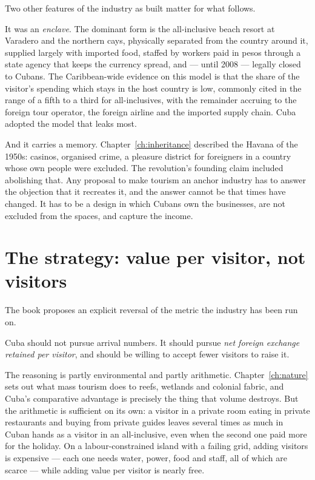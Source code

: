 Two other features of the industry as built matter for what follows.

It was an \emph{enclave}. The dominant form is the all-inclusive beach resort at
Varadero and the northern cays, physically separated from the country around it,
supplied largely with imported food, staffed by workers paid in pesos through a
state agency that keeps the currency spread, and --- until 2008 --- legally
closed to Cubans. The Caribbean-wide evidence on this model is that the share of
the visitor's spending which stays in the host country is low, commonly cited in
the range of a fifth to a third for all-inclusives, with the remainder accruing
to the foreign tour operator, the foreign airline and the imported supply
chain.\unv{} Cuba adopted the model that leaks most.

And it carries a memory. Chapter~\ref{ch:inheritance} described the Havana of
the 1950s: casinos, organised crime, a pleasure district for foreigners in a
country whose own people were excluded. The revolution's founding claim included
abolishing that. Any proposal to make tourism an anchor industry has to answer
the objection that it recreates it, and the answer cannot be that times have
changed. It has to be a design in which Cubans own the businesses, are not
excluded from the spaces, and capture the income.

\section{The strategy: value per visitor, not visitors}

The book proposes an explicit reversal of the metric the industry has been run
on.

Cuba should not pursue arrival numbers. It should pursue \emph{net foreign
exchange retained per visitor}, and should be willing to accept fewer visitors
to raise it.

The reasoning is partly environmental and partly arithmetic. Chapter~\ref{ch:nature}
sets out what mass tourism does to reefs, wetlands and colonial fabric, and Cuba's
comparative advantage is precisely the thing that volume destroys. But the
arithmetic is sufficient on its own: a visitor in a private room eating in
private restaurants and buying from private guides leaves several times as much
in Cuban hands as a visitor in an all-inclusive, even when the second one paid
more for the holiday. On a labour-constrained island with a failing grid, adding
visitors is expensive --- each one needs water, power, food and staff, all of
which are scarce --- while adding value per visitor is nearly free.

